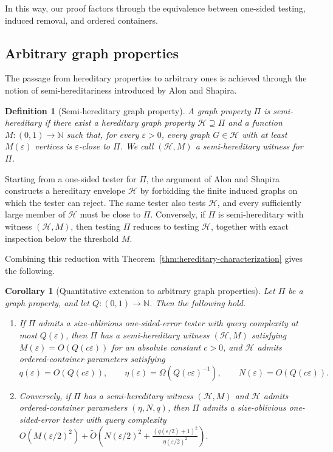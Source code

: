 \documentclass[11pt,reqno,letterpaper]{amsart}
\newcommand{\N}{{\mathbb N}}
\newcommand{\cH}{{\mathcal H}}
\theoremstyle{plain}
\newtheorem{cor}[thm]{Corollary}
\newtheorem{defn}[thm]{Definition}
\theoremstyle{remark}
\begin{document}
In this way, our proof factors through the equivalence between one-sided testing, induced removal, and ordered containers.

\subsection{Arbitrary graph properties}

The passage from hereditary properties to arbitrary ones is achieved through the notion of semi-hereditariness introduced by Alon and Shapira.

\begin{defn}[Semi-hereditary graph property]
A graph property $\Pi$ is \textit{semi-hereditary} if there exist a hereditary graph property $\cH\supseteq\Pi$ and a function $M:(0,1)\to\N$ such that, for every $\varepsilon>0$, every graph $G\in\cH$ with at least $M(\varepsilon)$ vertices is $\varepsilon$-close to $\Pi$. We call $(\cH,M)$ a \textit{semi-hereditary witness} for $\Pi$.
\end{defn}

Starting from a one-sided tester for $\Pi$, the argument of Alon and Shapira constructs a hereditary envelope $\cH$ by forbidding the finite induced graphs on which the tester can reject. The same tester also tests $\cH$, and every sufficiently large member of $\cH$ must be close to $\Pi$. Conversely, if $\Pi$ is semi-hereditary with witness $(\cH,M)$, then testing $\Pi$ reduces to testing $\cH$, together with exact inspection below the threshold $M$.

Combining this reduction with Theorem~\ref{thm:hereditary-characterization} gives the following.

\begin{cor}[Quantitative extension to arbitrary graph properties]
\label{cor:full-characterization}
Let $\Pi$ be a graph property, and let $Q:(0,1)\to\N$. Then the following hold.
\begin{enumerate}[label=\textnormal{(\roman*)}]
\item If $\Pi$ admits a size-oblivious one-sided-error tester with query complexity at most $Q(\varepsilon)$, then $\Pi$ has a semi-hereditary witness $(\cH,M)$ satisfying $M(\varepsilon)=O(Q(c\varepsilon))$ for an absolute constant $c>0$, and $\cH$ admits ordered-container parameters satisfying
\[
q(\varepsilon)=O(Q(c\varepsilon)),\qquad
\eta(\varepsilon)=\Omega(Q(c\varepsilon)^{-1}),
\qquad
N(\varepsilon)=O(Q(c\varepsilon)).
\]

\item Conversely, if $\Pi$ has a semi-hereditary witness $(\cH,M)$ and $\cH$ admits ordered-container parameters $(\eta,N,q)$, then $\Pi$ admits a size-oblivious one-sided-error tester with query complexity
\(O\!\left(M(\varepsilon/2)^2\right) + \widetilde O\!\left( N(\varepsilon/2)^2+ \frac{(q(\varepsilon/2)+1)^2} {\eta(\varepsilon/2)^2} \right).\)

\end{enumerate}
\end{cor}
\end{document}

